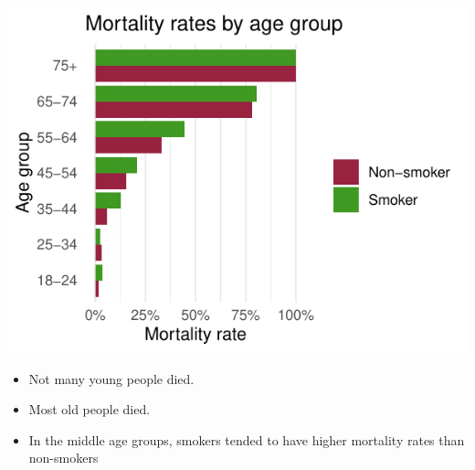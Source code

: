 \documentclass[a4paper]{article}
\begin{document}
\begin{Schunk}
{\centering \includegraphics[width=\maxwidth]{figure/listings-unnamed-chunk-13-1} 

}

\end{Schunk}
\begin{itemize}
	\item Not many young people died.
	\item Most old people died.
	\item In the middle age groups, smokers tended to have higher mortality rates than non-smokers
\end{itemize}
\end{document}

